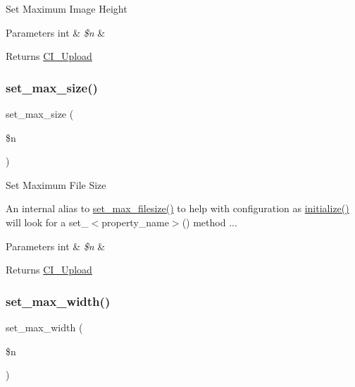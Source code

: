 Set Maximum Image Height


\begin{DoxyParams}[1]{Parameters}
int & {\em \$n} & \\
\hline
\end{DoxyParams}
\begin{DoxyReturn}{Returns}
\mbox{\hyperlink{class_c_i___upload}{C\+I\+\_\+\+Upload}} 
\end{DoxyReturn}
\mbox{\label{class_c_i___upload_ac6e7445ece6780c730e910d978dde95e}} 
\subsubsection{\texorpdfstring{set\+\_\+max\+\_\+size()}{set\_max\_size()}}
{\footnotesize\ttfamily set\+\_\+max\+\_\+size (\begin{DoxyParamCaption}\item[{}]{\$n }\end{DoxyParamCaption})\hspace{0.3cm}{\ttfamily [protected]}}

Set Maximum File Size

An internal alias to \mbox{\hyperlink{class_c_i___upload_a1f78c3a54f32d313294b27cde4eafaf4}{set\+\_\+max\+\_\+filesize()}} to help with configuration as \mbox{\hyperlink{class_c_i___upload_a58cef448bae0c178f3f675700b7e4413}{initialize()}} will look for a set\+\_\+$<$property\+\_\+name$>$() method ...


\begin{DoxyParams}[1]{Parameters}
int & {\em \$n} & \\
\hline
\end{DoxyParams}
\begin{DoxyReturn}{Returns}
\mbox{\hyperlink{class_c_i___upload}{C\+I\+\_\+\+Upload}} 
\end{DoxyReturn}
\mbox{\label{class_c_i___upload_a4028f187a825a666976cc3fe47cd44a8}} 
\subsubsection{\texorpdfstring{set\+\_\+max\+\_\+width()}{set\_max\_width()}}
{\footnotesize\ttfamily set\+\_\+max\+\_\+width (\begin{DoxyParamCaption}\item[{}]{\$n }\end{DoxyParamCaption})}

